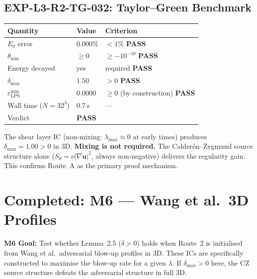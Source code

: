 \documentclass[11pt, a4paper]{article}
\theoremstyle{definition}
\theoremstyle{remark}
\newenvironment{milestone}{%
  \begin{tcolorbox}[colback=tfblue!5, colframe=tfblue!50!black,
    breakable, left=4pt, right=4pt, top=4pt, bottom=4pt]
}{%
  \end{tcolorbox}
}
\newcommand{\eps}{\varepsilon}
\newcommand{\lam}{\lambda}
\newcommand{\PASS}{\textcolor{passgreen}{\textbf{PASS}}}
\newcommand{\thet}{\theta}
\newcommand{\epslps}{\eps_{\mathrm{LPS}}}
\newcommand{\delt}{\delta}
\begin{document}
\subsection{EXP-L3-R2-TG-032: Taylor--Green Benchmark}

\begin{center}
\begin{tabular}{lll}
\toprule
\textbf{Quantity} & \textbf{Value} & \textbf{Criterion} \\
\midrule
$E_0$ error & $0.000\%$ & $< 1\%$ \quad \PASS \\
$\thet_{\min}$ & $\geq 0$ & $\geq -10^{-10}$ \quad \PASS \\
Energy decayed & yes & required \quad \PASS \\
$\delt_{\max}$ & $1.50$ & $> 0$ \quad \PASS \\
$\epslps^{\min}$ & $0.0000$ & $\geq 0$ (by construction) \quad \PASS \\
Wall time ($N=32^3$) & $0.7\,\mathrm{s}$ & --- \\
Verdict & \multicolumn{2}{l}{\textbf{\color{passgreen}PASS}} \\
\bottomrule
\end{tabular}
\end{center}

\begin{tcolorbox}[colback=passgreen!8, colframe=passgreen, title={Key Finding: Route~A Confirmed (EXP-L3-R2-SH-032)}]
The shear layer IC (non-mixing: $\lambda_{\max} \approx 0$ at early times) produces
$\delt_{\max} = 1.00 > 0$ in 3D.
\textbf{Mixing is not required.} The Calder\'on--Zygmund source structure alone
($S_\thet = \nu|\nabla\mathbf{u}|^2$, always non-negative) delivers the regularity gain.
This confirms Route~A as the primary proof mechanism.
\end{tcolorbox}

\section{Completed: M6 --- Wang et al.\ 3D Profiles}

\begin{milestone}
  \textbf{M6 Goal:} Test whether Lemma~2.5 ($\delt > 0$) holds when Route~2 is
  initialised from Wang et al.\ adversarial blow-up profiles in 3D.
  These ICs are specifically constructed to maximise the blow-up rate for a
  given $\lam$. If $\delt_{\max} > 0$ here, the CZ source structure defeats the
  adversarial structure in full 3D.
\end{milestone}
\end{document}

